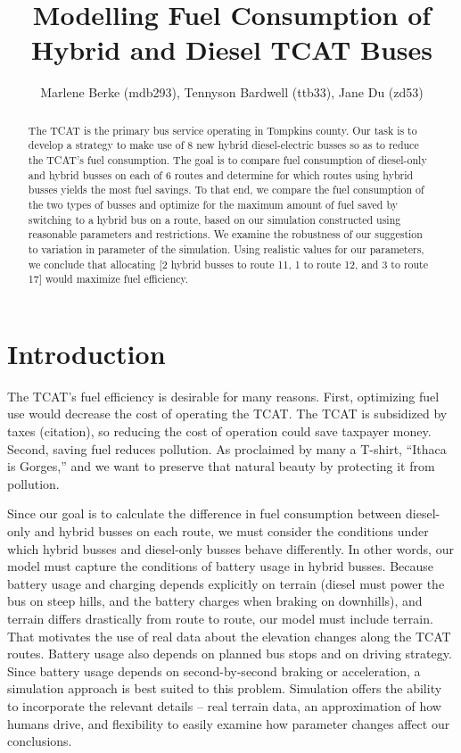 \documentclass[twocolumn,showpacs,%
  nofootinbib,aps,superscriptaddress,%
  eqsecnum,prd,notitlepage,showkeys,10pt]{revtex4-1}
\begin{document}
\title{Modelling Fuel Consumption of Hybrid and Diesel TCAT Buses}
\author{Marlene Berke (mdb293), Tennyson Bardwell (ttb33), Jane Du (zd53)}

\begin{abstract}
The TCAT is the primary bus service operating in Tompkins county. Our task is to develop a strategy to make use of 8 new hybrid diesel-electric busses so as to reduce the TCAT’s fuel consumption. The goal is to compare fuel consumption of diesel-only and hybrid busses on each of 6 routes and determine for which routes using hybrid busses yields the most fuel savings. To that end, we compare the fuel consumption of the two types of busses and optimize for the maximum amount of fuel saved by switching to a hybrid bus on a route, based on our simulation constructed using reasonable parameters and restrictions. We examine the robustness of our suggestion to variation in parameter of the simulation. Using realistic values for our parameters, we conclude that allocating [2 hybrid busses to route 11, 1 to route 12, and 3 to route 17] would maximize fuel efficiency.

\end{abstract}

\maketitle

\section{Introduction}

The TCAT’s fuel efficiency is desirable for many reasons. First, optimizing fuel use would decrease the cost of operating the TCAT. The TCAT is subsidized by taxes (citation), so reducing the cost of operation could save taxpayer money. Second, saving fuel reduces pollution. As proclaimed by many a T-shirt, “Ithaca is Gorges,” and we want to preserve that natural beauty by protecting it from pollution.

Since our goal is to calculate the difference in fuel consumption between diesel-only and hybrid busses on each route, we must consider the conditions under which hybrid busses and diesel-only busses behave differently. In other words, our model must capture the conditions of battery usage in hybrid busses. Because battery usage and charging depends explicitly on terrain (diesel must power the bus on steep hills, and the battery charges when braking on downhills), and terrain differs drastically from route to route, our model must include terrain. That motivates the use of real data about the elevation changes along the TCAT routes. Battery usage also depends on planned bus stops and on driving strategy. Since battery usage depends on second-by-second braking or acceleration, a simulation approach is best suited to this problem. Simulation offers the ability to incorporate the relevant details -- real terrain data, an approximation of how humans drive, and flexibility to easily examine how parameter changes affect our conclusions. 
\end{document}
